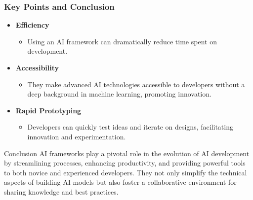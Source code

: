 \documentclass{beamer}
\begin{document}
\begin{frame}[fragile]
    \frametitle{Key Points and Conclusion}
    \begin{itemize}
        \item \textbf{Efficiency}
        \begin{itemize}
            \item Using an AI framework can dramatically reduce time spent on development.
        \end{itemize}

        \item \textbf{Accessibility}
        \begin{itemize}
            \item They make advanced AI technologies accessible to developers without a deep background in machine learning, promoting innovation.
        \end{itemize}

        \item \textbf{Rapid Prototyping}
        \begin{itemize}
            \item Developers can quickly test ideas and iterate on designs, facilitating innovation and experimentation.
        \end{itemize}
    \end{itemize}

    \begin{block}{Conclusion}
        AI frameworks play a pivotal role in the evolution of AI development by streamlining processes, enhancing productivity, and providing powerful tools to both novice and experienced developers. They not only simplify the technical aspects of building AI models but also foster a collaborative environment for sharing knowledge and best practices.
    \end{block}
\end{frame}
\end{document}
